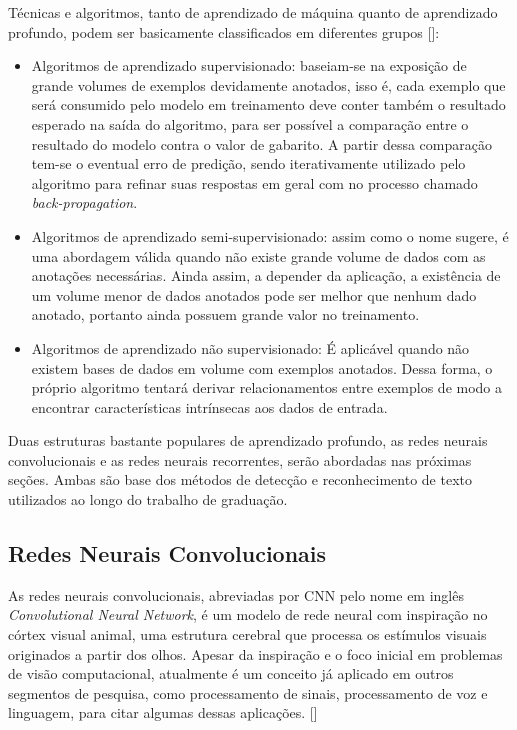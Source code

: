 Técnicas e algoritmos, tanto de aprendizado de máquina quanto de aprendizado profundo, podem ser basicamente classificados 
em diferentes grupos []:

\begin{itemize}
    \item Algoritmos de aprendizado supervisionado: baseiam-se na exposição de grande volumes de exemplos devidamente anotados, 
    isso é, cada exemplo que será consumido pelo modelo em treinamento deve conter também o resultado esperado na saída do algoritmo, 
    para ser possível a comparação entre o resultado do modelo contra o valor de gabarito. A partir dessa comparação tem-se o eventual 
    erro de predição, sendo iterativamente utilizado pelo algoritmo para refinar suas respostas em geral com no processo chamado \textit{back-propagation}.

    \item Algoritmos de aprendizado semi-supervisionado: assim como o nome sugere, é uma abordagem válida quando não existe grande 
    volume de dados com as anotações necessárias. Ainda assim, a depender da aplicação, a existência de um volume menor de dados 
    anotados pode ser melhor que nenhum dado anotado, portanto ainda possuem grande valor no treinamento.

    \item Algoritmos de aprendizado não supervisionado: É aplicável quando não existem bases de dados em volume com exemplos anotados. 
    Dessa forma, o próprio algoritmo tentará derivar relacionamentos entre exemplos de modo a encontrar características intrínsecas aos dados de entrada.
\end{itemize}

Duas estruturas bastante populares de aprendizado profundo, as redes neurais convolucionais e as redes neurais recorrentes, serão 
abordadas nas próximas seções. Ambas são base dos métodos de detecção e reconhecimento de texto utilizados ao longo do trabalho de graduação.


\subsection{Redes Neurais Convolucionais}
As redes neurais convolucionais, abreviadas por CNN pelo nome em inglês \textit{Convolutional Neural Network}, é um modelo de rede neural 
com inspiração no córtex visual animal, uma estrutura cerebral que processa os estímulos visuais originados a partir dos olhos. Apesar da 
inspiração e o foco inicial em problemas de visão computacional, atualmente é um conceito já aplicado em outros segmentos de pesquisa, 
como processamento de sinais, processamento de voz e linguagem, para citar algumas dessas aplicações. []

